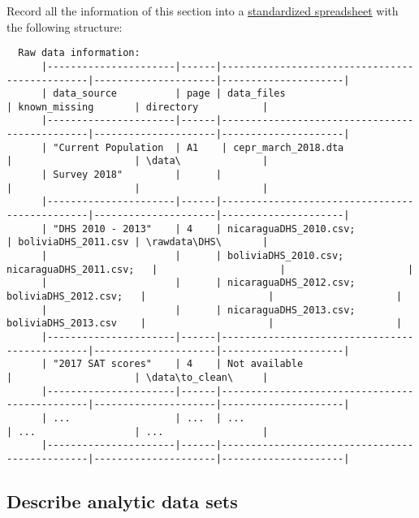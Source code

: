 \documentclass[]{book}
\begin{document}
Record all the information of this section into a \href{https://docs.google.com/spreadsheets/d/1LUIdVFH0OfR70C7z07TYeE-uWzKI_JIeWUMaYhqEKK0/edit\#gid=0\&range=A1}{standardized spreadsheet} with the following structure:

\begin{verbatim}
  Raw data information:
      |----------------------|------|-----------------------------------------------|---------------------|---------------------|
      | data_source          | page | data_files                                    | known_missing       | directory           |
      |----------------------|------|-----------------------------------------------|---------------------|---------------------|
      | "Current Population  | A1    | cepr_march_2018.dta                          |                     | \data\              |
      | Survey 2018"         |      |                                               |                     |                     |
      |----------------------|------|-----------------------------------------------|---------------------|---------------------|
      | "DHS 2010 - 2013"    | 4    | nicaraguaDHS_2010.csv;                        | boliviaDHS_2011.csv | \rawdata\DHS\       |
      |                      |      | boliviaDHS_2010.csv; nicaraguaDHS_2011.csv;   |                     |                     |
      |                      |      | nicaraguaDHS_2012.csv; boliviaDHS_2012.csv;   |                     |                     |
      |                      |      | nicaraguaDHS_2013.csv; boliviaDHS_2013.csv    |                     |                     |
      |----------------------|------|-----------------------------------------------|---------------------|---------------------|
      | "2017 SAT scores"    | 4    | Not available                                 |                     | \data\to_clean\     |
      |----------------------|------|-----------------------------------------------|---------------------|---------------------|
      | ...                  | ...  | ...                                           | ...                 | ...                 |
      |----------------------|------|-----------------------------------------------|---------------------|---------------------|
\end{verbatim}

\hypertarget{describe-analytic-data-sets}{%
\subsection{Describe analytic data sets}\label{describe-analytic-data-sets}}
\end{document}
